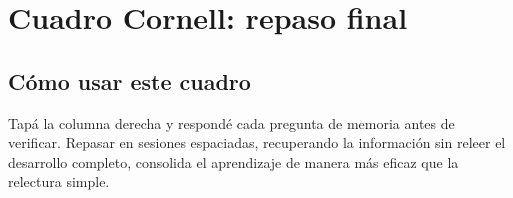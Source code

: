 \documentclass[12pt,oneside]{book}
\begin{document}
\chapter{Cuadro Cornell: repaso final}

\section{Cómo usar este cuadro}

Tapá la columna derecha y respondé cada pregunta de memoria antes de verificar. Repasar en sesiones espaciadas, recuperando la información sin releer el desarrollo completo, consolida el aprendizaje de manera más eficaz que la relectura simple.
\end{document}
